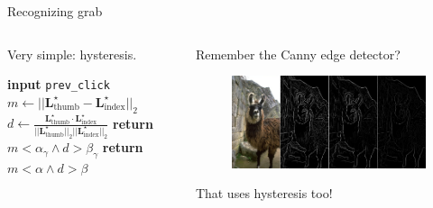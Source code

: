 \documentclass[english]{beamer}
\begin{document}
\begin{frame}{Recognizing grab}
    \begin{columns}
        \begin{column}{.5\textwidth}
            Very simple: hysteresis.

            \begin{algorithmic}[1]
                \State \textbf{input} \texttt{prev\_click}
                \State $m \gets ||\mathbf{L}^\star_{\mathrm{thumb}} - \mathbf{L}^\star_{\mathrm{index}}||_2$
                \State $d \gets \frac{\mathbf{L}^\star_{\mathrm{thumb}}\cdot\mathbf{L}^\star_{\mathrm{index}}}{||\mathbf{L}^\star_{\mathrm{thumb}}||_2 ||\mathbf{L}^\star_{\mathrm{index}}||_2}$
                    \State \textbf{return} $m < \alpha_\gamma \land d > \beta_\gamma$
                \Else
                    \State \textbf{return} $m < \alpha \land d > \beta$
                \EndIf
            \end{algorithmic}
        \end{column}
        \begin{column}{.5\textwidth}
            Remember the Canny edge detector?
            \begin{figure}
                \centering
                \includegraphics[width=\textwidth]{images/canny.png}
            \end{figure}
            That uses hysteresis too!
        \end{column}
    \end{columns}
\end{frame}
\end{document}
